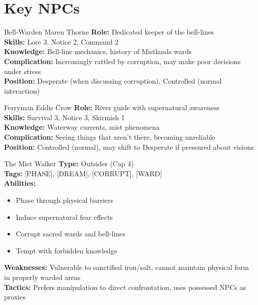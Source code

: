 \documentclass[11pt]{article}
\begin{document}
\section*{Key NPCs}

\begin{npcbox}{Bell-Warden Maren Thorne}
    \textbf{Role:} Dedicated keeper of the bell-lines \\
    \textbf{Skills:} Lore 3, Notice 2, Command 2 \\
    \textbf{Knowledge:} Bell-line mechanics, history of Mistlands wards \\
    \textbf{Complication:} Increasingly rattled by corruption, may make poor decisions under stress \\
    \textbf{Position:} Desperate (when discussing corruption), Controlled (normal interaction)
\end{npcbox}

\begin{npcbox}{Ferryman Eddis Crow}
    \textbf{Role:} River guide with supernatural awareness \\
    \textbf{Skills:} Survival 3, Notice 3, Skirmish 1 \\
    \textbf{Knowledge:} Waterway currents, mist phenomena \\
    \textbf{Complication:} Seeing things that aren't there, becoming unreliable \\
    \textbf{Position:} Controlled (normal), may shift to Desperate if pressured about visions
\end{npcbox}

\begin{npcbox}{The Mist Walker}
    \textbf{Type:} Outsider (Cap 4) \\
    \textbf{Tags:} [PHASE], [DREAM], [CORRUPT], [WARD] \\
    \textbf{Abilities:}
    \begin{itemize}
        \item Phase through physical barriers
        \item Induce supernatural fear effects
        \item Corrupt sacred wards and bell-lines
        \item Tempt with forbidden knowledge
    \end{itemize}
    \textbf{Weaknesses:} Vulnerable to sanctified iron/salt, cannot maintain physical form in properly warded areas \\
    \textbf{Tactics:} Prefers manipulation to direct confrontation, uses possessed NPCs as proxies
\end{npcbox}
\end{document}
